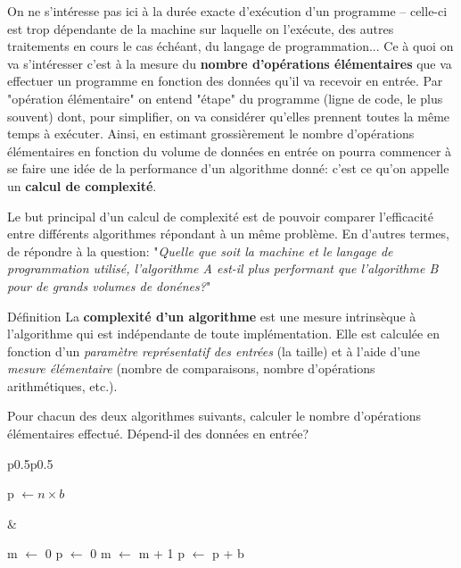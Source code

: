 \documentclass[12pt]{article}
\begin{document}
	On ne s'intéresse pas ici à la durée exacte d'exécution d'un programme -- celle-ci est trop dépendante de la machine sur laquelle on l'exécute, des autres traitements en cours le cas échéant, du langage de programmation... Ce à quoi on va s'intéresser c'est à la mesure du \textbf{nombre d'opérations élémentaires} que va effectuer un programme en fonction des données qu'il va recevoir en entrée. Par "opération élémentaire" on entend "étape" du programme (ligne de code, le plus souvent) dont, pour simplifier, on va considérer qu'elles prennent toutes la même temps à exécuter. Ainsi, en estimant grossièrement le nombre d'opérations élémentaires en fonction du volume de données en entrée on pourra commencer à se faire une idée de la performance d'un algorithme donné: c'est ce qu'on appelle un \textbf{calcul de complexité}.
	
	Le but principal d'un calcul de complexité est de pouvoir comparer l’efficacité entre différents algorithmes répondant à un même problème. En d'autres termes, de répondre à la question: "\textit{Quelle que soit la machine et le langage de programmation utilisé, l'algorithme A est-il plus performant que l'algorithme B pour de grands volumes de donénes?}"
	
	\begin{MonAmp}{Définition}
		La \textbf{complexité d’un algorithme} est une mesure intrinsèque à l'algorithme qui est indépendante de toute implémentation. Elle est calculée en fonction d’un \textit{paramètre représentatif des entrées} (la taille) et à l'aide d'une \textit{mesure élémentaire} (nombre de comparaisons, nombre d’opérations arithmétiques, etc.).
	\end{MonAmp}
	
	\begin{MonExo}
		Pour chacun des deux algorithmes suivants, calculer le nombre d'opérations élémentaires effectué. Dépend-il des données en entrée?
		
		\begin{tabular}{p{0.5\textwidth}p{0.5\textwidth}}
			\begin{minipage}{\linewidth}
				\begin{algorithmic}[1]
					\State p $\leftarrow n \times b$
					\State{}
					\EndFunction
				\end{algorithmic}
			\end{minipage}
			&
			\begin{minipage}{\linewidth}
				\begin{algorithmic}[1]
					\State m $\leftarrow$ 0
					\State p $\leftarrow$ 0
					\State m $\leftarrow$ m + 1
					\State p $\leftarrow$ p + b
					\EndWhile
					\State{}
					\EndFunction
				\end{algorithmic}
			\end{minipage}
			\\
		\end{tabular}
	\end{MonExo}
		
\end{document}
